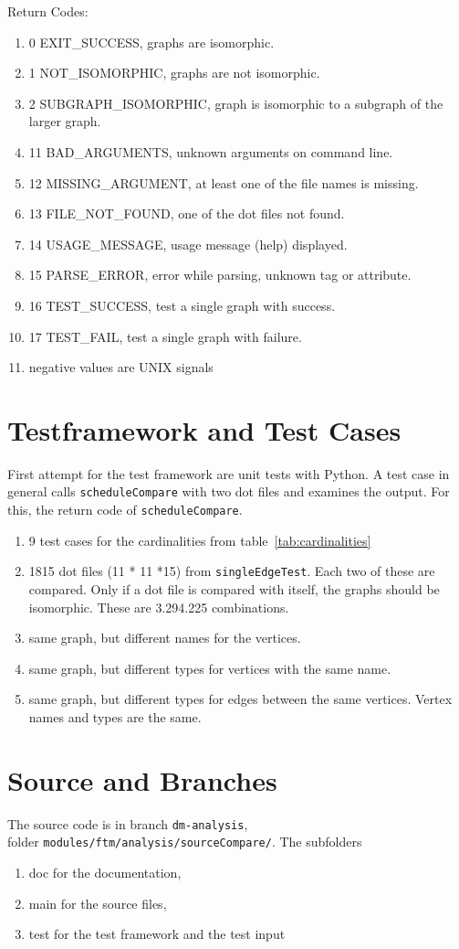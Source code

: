 \documentclass[12pt,a4paper]{report}
\begin{document}
Return Codes:
\begin{enumerate}
	\item 0 EXIT\_SUCCESS, graphs are isomorphic.
	\item 1 NOT\_ISOMORPHIC, graphs are not isomorphic.
	\item 2 SUBGRAPH\_ISOMORPHIC, graph is isomorphic to a subgraph of the larger graph.
	\item 11 BAD\_ARGUMENTS, unknown arguments on command line.
	\item 12 MISSING\_ARGUMENT, at least one of the file names is missing.
	\item 13 FILE\_NOT\_FOUND, one of the dot files not found.
	\item 14 USAGE\_MESSAGE, usage message (help) displayed.
  \item 15 PARSE\_ERROR, error while parsing, unknown tag or attribute.
  \item 16 TEST\_SUCCESS, test a single graph with success.
  \item 17 TEST\_FAIL, test a single graph with failure.
	\item negative values are UNIX signals
\end{enumerate}

\chapter{Testframework and Test Cases}
First attempt for the test framework are unit tests with Python. A test case in general calls \texttt{scheduleCompare} with two dot files and examines the output. For this, the return code of \texttt{scheduleCompare}.

\begin{enumerate}
	\item 9 test cases for the cardinalities from table~\ref{tab:cardinalities}
	\item 1815 dot files (11 * 11 *15) from \texttt{singleEdgeTest}. Each two of these are compared. Only if a dot file is compared with itself, the graphs should be isomorphic. These are 3.294.225 combinations.
	\item same graph, but different names for the vertices.
	\item same graph, but different types for vertices with the same name.
	\item same graph, but different types for edges between the same vertices. Vertex names and types are the same.
\end{enumerate}

\chapter{Source and Branches}
The source code is in branch \texttt{dm-analysis}, \\ 
folder \texttt{modules/ftm/analysis/sourceCompare/}. The subfolders
\begin{enumerate}
	\item doc for the documentation,
	\item main for the source files,
	\item test for the test framework and the test input
\end{enumerate}
\end{document}
